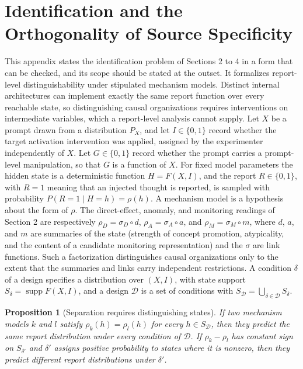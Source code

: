 \documentclass[11pt]{article}
\newtheorem{proposition}{Proposition}
\theoremstyle{definition}
\theoremstyle{remark}
\begin{document}
\appendix

\section{Identification and the Orthogonality of Source Specificity}\label{app:ident}

This appendix states the identification problem of Sections 2 to 4 in a form that can be checked, and its scope should be stated at the outset. It formalizes report-level distinguishability under stipulated mechanism models. Distinct internal architectures can implement exactly the same report function over every reachable state, so distinguishing causal organizations requires interventions on intermediate variables, which a report-level analysis cannot supply. Let $X$ be a prompt drawn from a distribution $P_X$, and let $I\in\{0,1\}$ record whether the target activation intervention was applied, assigned by the experimenter independently of $X$. Let $G\in\{0,1\}$ record whether the prompt carries a prompt-level manipulation, so that $G$ is a function of $X$. For fixed model parameters the hidden state is a deterministic function $H=F(X,I)$, and the report $R\in\{0,1\}$, with $R=1$ meaning that an injected thought is reported, is sampled with probability $P(R=1\mid H=h)=\rho(h)$. A mechanism model is a hypothesis about the form of $\rho$. The direct-effect, anomaly, and monitoring readings of Section 2 are respectively $\rho_D=\sigma_D\circ d$, $\rho_A=\sigma_A\circ a$, and $\rho_M=\sigma_M\circ m$, where $d$, $a$, and $m$ are summaries of the state (strength of concept promotion, atypicality, and the content of a candidate monitoring representation) and the $\sigma$ are link functions. Such a factorization distinguishes causal organizations only to the extent that the summaries and links carry independent restrictions. A condition $\delta$ of a design specifies a distribution over $(X,I)$, with state support $S_\delta=\operatorname{supp}F(X,I)$, and a design $\mathcal{D}$ is a set of conditions with $S_{\mathcal{D}}=\bigcup_{\delta\in\mathcal{D}}S_\delta$.

\begin{proposition}[Separation requires distinguishing states]\label{prop:sep}
If two mechanism models $k$ and $l$ satisfy $\rho_k(h)=\rho_l(h)$ for every $h\in S_{\mathcal{D}}$, then they predict the same report distribution under every condition of $\mathcal{D}$. If $\rho_k-\rho_l$ has constant sign on $S_{\delta'}$ and $\delta'$ assigns positive probability to states where it is nonzero, then they predict different report distributions under $\delta'$.
\end{proposition}
\end{document}
